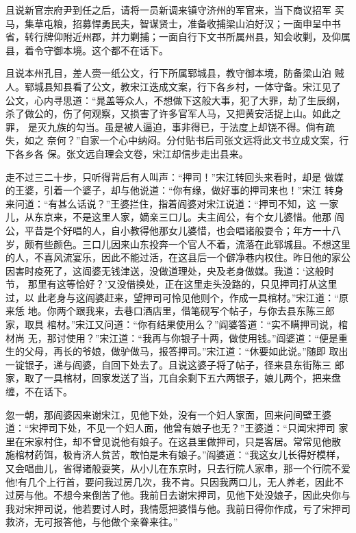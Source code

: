 且说新官宗府尹到任之后，请将一员新调来镇守济州的军官来，当下商议招军
买马，集草屯粮，招募悍勇民夫，智谋贤士，准备收捕梁山泊好汉；一面申呈中书
省，转行牌仰附近州郡，并力剿捕；一面自行下文书所属州县，知会收剿，及仰属
县，着令守御本境。这个都不在话下。

且说本州孔目，差人赍一纸公文，行下所属郓城县，教守御本境，防备梁山泊
贼人。郓城县知县看了公文，教宋江迭成文案，行下各乡村，一体守备。宋江见了
公文，心内寻思道：“晁盖等众人，不想做下这般大事，犯了大罪，劫了生辰纲，
杀了做公的，伤了何观察，又损害了许多官军人马，又把黄安活捉上山。如此之罪，
是灭九族的勾当。虽是被人逼迫，事非得已，于法度上却饶不得。倘有疏失，如之
奈何？”自家一个心中纳闷。分付贴书后司张文远将此文书立成文案，行下各乡各
保。张文远自理会文卷，宋江却信步走出县来。

走不过三二十步，只听得背后有人叫声：“押司！”宋江转回头来看时，却是
做媒的王婆，引着一个婆子，却与他说道：“你有缘，做好事的押司来也！”宋江
转身来问道：“有甚么话说？”王婆拦住，指着阎婆对宋江说道：“押司不知，这
一家儿，从东京来，不是这里人家，嫡亲三口儿。夫主阎公，有个女儿婆惜。他那
阎公，平昔是个好唱的人，自小教得他那女儿婆惜，也会唱诸般耍令；年方一十八
岁，颇有些颜色。三口儿因来山东投奔一个官人不着，流落在此郓城县。不想这里
的人，不喜风流宴乐，因此不能过活，在这县后一个僻净巷内权住。昨日他的家公
因害时疫死了，这阎婆无钱津送，没做道理处，央及老身做媒。我道：‘这般时节，
那里有这等恰好？’又没借换处，正在这里走头没路的，只见押司打从这里过，以
此老身与这阎婆赶来，望押司可怜见他则个，作成一具棺材。”宋江道：“原来恁
地。你两个跟我来，去巷口酒店里，借笔砚写个帖子，与你去县东陈三郎家，取具
棺材。”宋江又问道：“你有结果使用么？”阎婆答道：“实不瞒押司说，棺材尚
无，那讨使用？”宋江道：“我再与你银子十两，做使用钱。”阎婆道：“便是重
生的父母，再长的爷娘，做驴做马，报答押司。”宋江道：“休要如此说。”随即
取出一锭银子，递与阎婆，自回下处去了。且说这婆子将了帖子，径来县东街陈三
郎家，取了一具棺材，回家发送了当，兀自余剩下五六两银子，娘儿两个，把来盘
缠，不在话下。

忽一朝，那阎婆因来谢宋江，见他下处，没有一个妇人家面，回来问间壁王婆
道：“宋押司下处，不见一个妇人面，他曾有娘子也无？”王婆道：“只闻宋押司
家里在宋家村住，却不曾见说他有娘子。在这县里做押司，只是客居。常常见他散
施棺材药饵，极肯济人贫苦，敢怕是未有娘子。”阎婆道：“我这女儿长得好模样，
又会唱曲儿，省得诸般耍笑，从小儿在东京时，只去行院人家串，那一个行院不爱
他!有几个上行首，要问我过房几次，我不肯。只因我两口儿，无人养老，因此不
过房与他。不想今来倒苦了他。我前日去谢宋押司，见他下处没娘子，因此央你与
我对宋押司说，他若要讨人时，我情愿把婆惜与他。我前日得你作成，亏了宋押司
救济，无可报答他，与他做个亲眷来往。”

